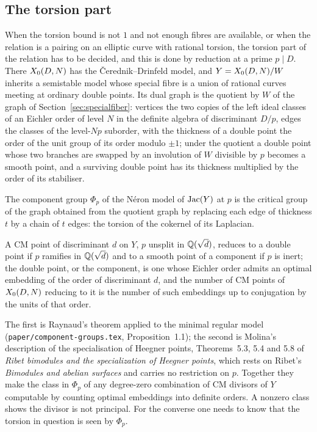 \subsection{The torsion part}\label{sec:candidates-torsion}

When the torsion bound is not $1$ and not enough fibres are available, or when the relation is a pairing on an
elliptic curve with rational torsion, the torsion part of the relation has to be decided, and this is done by
reduction at a prime $p\mid D$. There $X_0({D},{N})$ has the \v{C}erednik--Drinfeld model, and $Y=X_0({D},{N})/W$
inherits a semistable model whose special fibre is a union of rational curves meeting at ordinary double points.
Its dual graph is the quotient by $W$ of the graph of Section~\ref{sec:specialfiber}: vertices the two copies of
the left ideal classes of an Eichler order of level $N$ in the definite algebra of discriminant $D/p$, edges the
classes of the level-$Np$ suborder, with the thickness of a double point the order of the unit group of its
order modulo $\pm1$; under the quotient a double point whose two branches are swapped by an involution of $W$
divisible by $p$ becomes a smooth point, and a surviving double point has its thickness multiplied by the order
of its stabiliser.

\begin{proposition}\label{prop:component-group}
The component group $\Phi_p$ of the N\'eron model of $\operatorname{Jac}(Y)$ at $p$ is the critical group of the graph obtained
from the quotient graph by replacing each edge of thickness $t$ by a chain of $t$ edges: the torsion of the
cokernel of its Laplacian.
\end{proposition}

\begin{proposition}\label{prop:cm-reduction}
A CM point of discriminant $d$ on $Y$, $p$ unsplit in $\mathbb{Q}(\sqrt d)$, reduces to a double point if $p$ ramifies in
$\mathbb{Q}(\sqrt d)$ and to a smooth point of a component if $p$ is inert; the double point, or the component, is one
whose Eichler order admits an optimal embedding of the order of discriminant $d$, and the number of CM points of
$X_0({D},{N})$ reducing to it is the number of such embeddings up to conjugation by the units of that order.
\end{proposition}

The first is Raynaud's theorem applied to the minimal regular model (\texttt{paper/component-groups.tex},
Proposition~1.1); the second is Molina's description of the specialisation of Heegner points, Theorems~5.3,
5.4 and 5.8 of \emph{Ribet bimodules and the specialization of Heegner points}, which rests on Ribet's
\emph{Bimodules and abelian surfaces} and carries no restriction on $p$. Together they make the class in
$\Phi_p$ of any degree-zero combination of CM divisors of $Y$ computable by counting optimal embeddings into
definite orders. A nonzero class shows the divisor is not principal. For the converse one needs to know that
the torsion in question is seen by $\Phi_p$.

